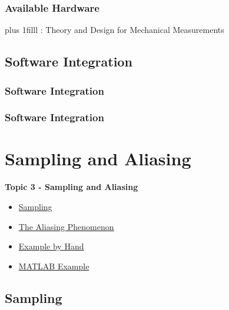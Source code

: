 \documentclass[fleqn]{beamer} %
\newcommand{\sectionIIItitle}{Sampling and Aliasing}
\newcommand{\sectionIIsubsectionIIItitle}{Available Hardware}
\newcommand{\sectionIIsubsectionIVtitle}{Software Integration}
\newcommand{\sectionIIIsubsectionItitle}{Sampling}
\newcommand{\sectionIIIsubsectionIItitle}{The Aliasing Phenomenon}
\newcommand{\sectionIIIsubsectionIIItitle}{Example by Hand}
\newcommand{\sectionIIIsubsectionIVtitle}{MATLAB Example}
\newcommand{\btVFill}{\vskip0pt plus 1filll}
\begin{document}
			\begin{frame}
			\frametitle{\sectionIIsubsectionIIItitle}




				\btVFill
				\tiny{ : Theory and Design for Mechanical Measurements}	

			\end{frame}

		\subsection{\sectionIIsubsectionIVtitle}\label{sectionIIsubsectionIV}

			\begin{frame}
				\frametitle{\sectionIIsubsectionIVtitle}


			\end{frame}

			\begin{frame}
				\frametitle{\sectionIIsubsectionIVtitle}


			\end{frame}
		
	\section{\sectionIIItitle}\label{sectionIII}

		\begin{frame}
			\large \textbf{Topic 3 - \sectionIIItitle} \vspace{3mm}\\

			\begin{itemize}
				\item \hyperlink{sectionIIIsubsectionI}{\sectionIIIsubsectionItitle} \vspc %
				\item \hyperlink{sectionIIIsubsectionII}{\sectionIIIsubsectionIItitle} \vspc %
				\item \hyperlink{sectionIIIsubsectionIII}{\sectionIIIsubsectionIIItitle} \vspc %
				\item \hyperlink{sectionIIIsubsectionIV}{\sectionIIIsubsectionIVtitle} \vspc %
			\end{itemize}

		\end{frame}

		\subsection{\sectionIIIsubsectionItitle}\label{sectionIIIsubsectionI}
\end{document}

